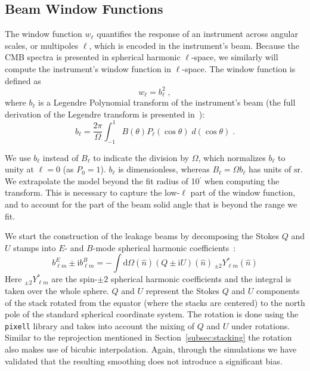\subsection{Beam Window Functions}
\label{subsec:window}

The window function $w_{\ell}$ quantifies the response of an instrument across angular scales, or multipoles $\ell$, which is encoded in the instrument's beam.  Because the CMB spectra is presented in spherical harmonic $\ell$-space, we similarly will compute the instrument's window function in $\ell$-space.  The window function is defined as
\begin{equation}
    w_\ell = b_\ell^2 \; ,
\end{equation}
where $b_\ell$ is a Legendre Polynomial transform of the instrument's beam (the full derivation of the Legendre transform is presented in~\cite{Lungu_2022}): 
\begin{equation}
b_{\ell} = \frac{2\pi}{\Omega}\int_{-1}^{1} B(\theta)P_{\ell}(\cos\theta)\; d(\cos\theta) \; .
\label{eq:legendre}
\end{equation}

We use $b_{\ell}$ instead of $B_{\ell}$ to indicate the division by $\Omega$, which normalizes $b_{\ell}$ to unity at $\ell = 0$ (as $P_0 = 1$). $b_{\ell}$ is dimensionless, whereas $B_{\ell} = \Omega b_{\ell}$ has units of $\mathrm{sr}$.  We extrapolate the model beyond the fit radius of 10$^{\prime}$ when computing the transform.  This is necessary to capture the low-$\ell$ part of the window function, and to account for the part of the beam solid angle that is beyond the range we fit.



We start the construction of the leakage beams by decomposing the Stokes $Q$ and $U$ stamps into $E$- and $B$-mode spherical harmonic coefficients~\cite{challinor_2000}:
\begin{equation}
\label{eq:pol_beam_coeffs}
b^{E}_{\ell m} \pm \mathrm{i} b^{B}_{\ell m} = - \int \mathrm{d}\Omega(\hat{n}) (Q \pm \mathrm{i} U)(\hat{n})\, {}_{\pm 2}Y^*_{\ell m}(\hat{n})
\end{equation}
Here ${}_{\pm 2}Y^*_{\ell m}$ are the spin-$\pm2$ spherical harmonic coefficients and the integral is taken over the whole sphere. $Q$ and $U$ represent the Stokes $Q$ and $U$ components of the stack rotated from the equator (where the stacks are centered) to the north pole of the standard spherical coordinate system. The rotation is done using the \texttt{pixell} library and takes into account the mixing of $Q$ and $U$ under rotations. Similar to the reprojection mentioned in Section~\ref{subsec:stacking} the rotation also makes use of bicubic interpolation. Again, through the simulations we have validated that the resulting smoothing does not introduce a significant bias.


